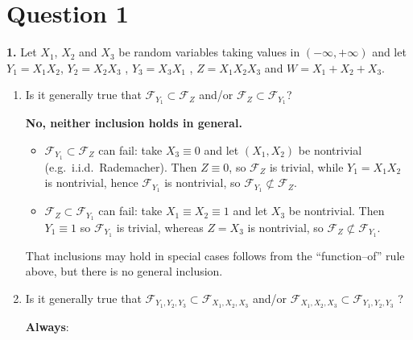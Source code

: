 \documentclass[dvipsnames,11pt]{article}
\begin{document}
\section*{Question 1}

\textbf{1.} Let $X_1$, $X_2$ and $X_3$ be random variables taking values in $(-\infty,+\infty)$ and let $Y_1=X_1X_2$, $Y_2=X_2X_3$ , $Y_3=X_3X_1$ , $Z=X_1X_2X_3$ and $W=X_1+X_2+X_3$.

    \begin{enumerate}[label=\alph*.]
        \item Is it generally true that $\mathcal F_{Y_1}\subset \mathcal F_{Z}$ and/or $\mathcal F_{Z}\subset \mathcal F_{Y_1}$?
    
            \begin{solution}
    
                \textbf{No, neither inclusion holds in general.}


                    \begin{itemize}
                        \item {$\mathcal F_{Y_1}\subset \mathcal F_Z$ can fail:} take $X_3\equiv 0$ and let $(X_1,X_2)$ be nontrivial (e.g.\ i.i.d.\ Rademacher). Then $Z\equiv 0$, so $\mathcal F_Z$ is trivial, while $Y_1=X_1X_2$ is nontrivial, hence $\mathcal F_{Y_1}$ is nontrivial, so $\mathcal F_{Y_1}\not\subset \mathcal F_Z$.

                        \item {$\mathcal F_Z\subset \mathcal F_{Y_1}$ can fail:} take $X_1\equiv X_2\equiv 1$ and let $X_3$ be nontrivial. Then $Y_1\equiv 1$ so $\mathcal F_{Y_1}$ is trivial, whereas $Z=X_3$ is nontrivial, so $\mathcal F_Z\not\subset \mathcal F_{Y_1}$.
                    \end{itemize}

                That inclusions may hold in special cases follows from the “function–of” rule above, but there is no general inclusion.
                
            \end{solution}
            
        \item Is it generally true that $\mathcal F_{Y_1,Y_2,Y_3}\subset \mathcal F_{X_1,X_2,X_3}$ and/or $\mathcal F_{X_1,X_2,X_3}\subset \mathcal F_{Y_1,Y_2,Y_3}$ ?
    
            \begin{solution}
    
                \textbf{Always}:
                

\end{solution}
\end{enumerate}
\end{document}
